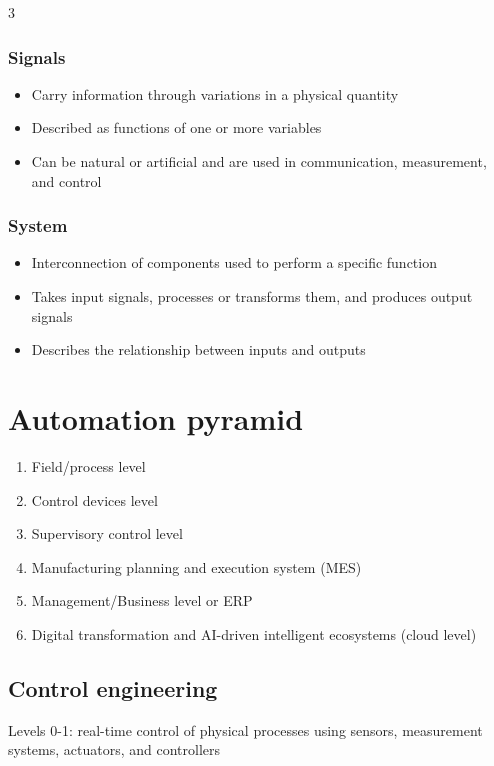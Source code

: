 \documentclass[9pt, landscape, a4paper]{article}
\begin{document}
\begin{multicols*}{3}
\subsubsection{Signals}
\begin{itemize}
    \item Carry information through variations in a physical quantity
    \item Described as functions of one or more variables
    \item Can be natural or artificial and are used in communication, measurement, and control
\end{itemize}

\subsubsection{System}
\begin{itemize}
    \item Interconnection of components used to perform a specific function
    \item Takes input signals, processes or transforms them, and produces output signals
    \item Describes the relationship between inputs and outputs
\end{itemize}

\section{Automation pyramid}
\begin{enumerate}[label=Level \arabic*., start=0]
    \item Field/process level
    \item Control devices level
    \item Supervisory control level
    \item Manufacturing planning and execution system (MES)
    \item Management/Business level or ERP
    \item Digital transformation and AI-driven intelligent ecosystems (cloud level)
\end{enumerate}

\subsection{Control engineering}
Levels 0-1: real-time control of physical processes using sensors, measurement systems, actuators, and controllers


\end{multicols*}
\end{document}
